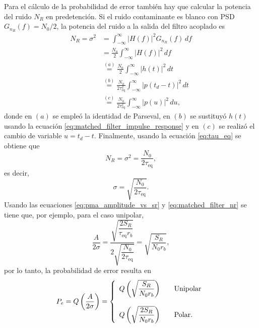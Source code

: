 \documentclass[a4paper]{article}
\begin{document}
Para el cálculo de la probabilidad de error también hay que calcular la potencia del ruido \(N_R\) en predetención. Si el ruido contaminante es blanco con PSD \(G_{n_R}(f)=N_0/2\), la potencia del ruido a la salida del filtro acoplado es
\begin{align*}
 N_{R}=\sigma^2&=\int_{-\infty}^{\infty}\left|H(f)\right|^2G_{n_R}(f)\,df\\
  &=\frac{N_0}{2}\int_{-\infty}^{\infty}\left|H(f)\right|^2\,df\\
  &\overset{(a)}{=}\frac{N_0}{2}\int_{-\infty}^{\infty}\left|h(t)\right|^2\,dt\\
  &\overset{(b)}{=}\frac{N_0}{2\tau_\textrm{eq}^2}\int_{-\infty}^{\infty}\left|p(t_d-t)\right|^2\,dt\\
  &\overset{(c)}{=}\frac{N_0}{2\tau_\textrm{eq}^2}\int_{-\infty}^{\infty}\left|p(u)\right|^2\,du,
\end{align*}
donde en \((a)\) se empleó la identidad de Parseval, en \((b)\) se sustituyó \(h(t)\) usando la ecuación \ref{eq:matched_filter_impulse_response} y en \((c)\) se realizó el cambio de variable \(u=t_d-t\). Finalmente, usando la ecuación \ref{eq:tau_eq} se obtiene que
\[
 N_{R}=\sigma^2=\frac{N_0}{2\tau_\textrm{eq}},
\]
es decir,
\begin{equation}\label{eq:matched_filter_nr}
 \sigma=\sqrt{\frac{N_0}{2\tau_\textrm{eq}}}.
\end{equation}
Usando las ecuaciones \ref{eq:pma_amplitude_vs_sr} y \ref{eq:matched_filter_nr} se tiene que, por ejemplo, para el caso unipolar,
\[
 \frac{A}{2\sigma}=\frac{\sqrt{\dfrac{2S_R}{\tau_\textrm{eq}r_b}}}{2\sqrt{\dfrac{N_0}{2\tau_\textrm{eq}}}}
 =\sqrt{\dfrac{S_R}{N_0r_b}},
\]
por lo tanto, la probabilidad de error resulta en
\begin{equation*}
 P_e=Q\left(\frac{A}{2\sigma}\right)
    =\left\{ 
      \begin{array}{l l l}
    Q\left(\sqrt{\dfrac{S_R}{N_0r_b}}\right) & & \textrm{Unipolar}\\
    \\
    Q\left(\sqrt{\dfrac{2S_R}{N_0r_b}}\right) & & \textrm{Polar.} \end{array} \right.
\end{equation*}
\end{document}
